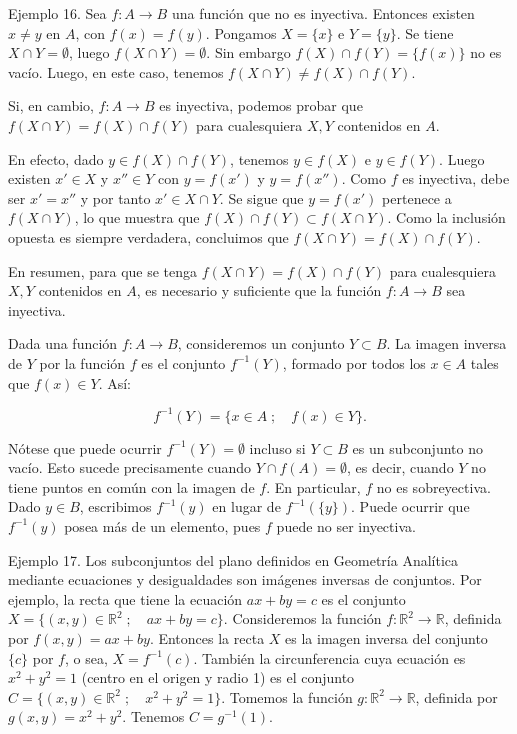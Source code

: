 Ejemplo 16. Sea \(f: A \to B\) una función que no es inyectiva. Entonces existen \(x \neq y\) en \(A\), con \(f(x) = f(y)\). Pongamos \(X = \{x\}\) e \(Y = \{y\}\). Se tiene \(X \cap Y = \emptyset\), luego \(f(X \cap Y) = \emptyset\). Sin embargo \(f(X) \cap f(Y) = \{f(x)\}\) no es vacío. Luego, en este caso, tenemos \(f(X \cap Y) \neq f(X) \cap f(Y)\).

Si, en cambio, \(f: A \to B\) es inyectiva, podemos probar que \(f(X \cap Y) = f(X) \cap f(Y)\) para cualesquiera \(X, Y\) contenidos en \(A\).

En efecto, dado \(y \in f(X) \cap f(Y)\), tenemos \(y \in f(X)\) e \(y \in f(Y)\). Luego existen \(x' \in X\) y \(x'' \in Y\) con \(y = f(x')\) y \(y = f(x'')\). Como \(f\) es inyectiva, debe ser \(x' = x''\) y por tanto \(x' \in X \cap Y\). Se sigue que \(y = f(x')\) pertenece a \(f(X \cap Y)\), lo que muestra que \(f(X) \cap f(Y) \subset f(X \cap Y)\). Como la inclusión opuesta es siempre verdadera, concluimos que \(f(X \cap Y) = f(X) \cap f(Y)\).

En resumen, para que se tenga \(f(X \cap Y) = f(X) \cap f(Y)\) para cualesquiera \(X, Y\) contenidos en \(A\), es necesario y suficiente que la función \(f: A \to B\) sea inyectiva.

Dada una función \(f: A \to B\), consideremos un conjunto \(Y \subset B\). La imagen inversa de \(Y\) por la función \(f\) es el conjunto \(f^{-1}(Y)\), formado por todos los \(x \in A\) tales que \(f(x) \in Y\). Así:

\[
f^{-1}(Y) = \{x \in A \; ; \quad f(x) \in Y\}.
\]

Nótese que puede ocurrir \(f^{-1}(Y) = \emptyset\) incluso si \(Y \subset B\) es un subconjunto no vacío. Esto sucede precisamente cuando \(Y \cap f(A) = \emptyset\), es decir, cuando \(Y\) no tiene puntos en común con la imagen de \(f\). En particular, \(f\) no es sobreyectiva. Dado \(y \in B\), escribimos \(f^{-1}(y)\) en lugar de \(f^{-1}(\{y\})\). Puede ocurrir que \(f^{-1}(y)\) posea más de un elemento, pues \(f\) puede no ser inyectiva.

Ejemplo 17. Los subconjuntos del plano definidos en Geometría Analítica mediante ecuaciones y desigualdades son imágenes inversas de conjuntos. Por ejemplo, la recta que tiene la ecuación \(ax + by = c\) es el conjunto \(X = \{(x, y) \in \mathbb{R}^2 \; ; \quad ax + by = c\}\). Consideremos la función \(f: \mathbb{R}^2 \to \mathbb{R}\), definida por \(f(x, y) = ax + by\). Entonces la recta \(X\) es la imagen inversa del conjunto \(\{c\}\) por \(f\), o sea, \(X = f^{-1}(c)\). También la circunferencia cuya ecuación es \(x^2 + y^2 = 1\) (centro en el origen y radio 1) es el conjunto \(C = \{(x, y) \in \mathbb{R}^2 \; ; \quad x^2 + y^2 = 1\}\). Tomemos la función \(g: \mathbb{R}^2 \to \mathbb{R}\), definida por \(g(x, y) = x^2 + y^2\). Tenemos \(C = g^{-1}(1)\).

